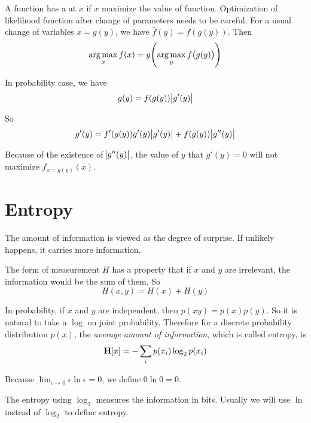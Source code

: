 \begin{theorem}
    A function has a  at $x$ if $x$ maximize the value of function. Optimization of likelihood function after change of parameters needs to be careful. For a usual change of variables $x = g(y)$, we have $\hat{f}(y) = f(g(y))$. Then
    \begin{equation}
         \argmax{x}f(x) = g\mleft(\argmax{y}f\mleft(g(y)\mright)\mright)
    \end{equation}
    
    In probability case, we have
    \begin{equation}
        g(y) = f(g(y)) \abs{g'(y)}
    \end{equation}
    
    So
    \begin{equation}
        g'(y) = f'(g(y)) g'(y) \abs{g'(y)} + f(g(y)) \abs{g''(y)}
    \end{equation}
    
    Because of the existence of $\abs{g''(y)}$, the value of $y$ that $g'(y) = 0$ will not maximize $f_{x = g(y)}(x)$.
\end{theorem}


\section{Entropy}

\begin{definition}
    The amount of information is viewed as the degree of surprise. If unlikely happens, it carries more information. 
    
    The form of measurement $H$ has a property that if $x$ and $y$ are irrelevant, the information would be the sum of them. So
    \begin{equation}
        H(x,y) = H(x) + H(y)
    \end{equation}
    
    In probability, if $x$ and $y$ are independent, then $p(xy)= p(x) p(y)$. So it is natural to take a $\log$ on joint probability. Therefore for a discrete probability distribution $p(x)$, the \emph{average amount of information}, which is called entropy, is
    \begin{equation}
        \entropy{x} = - \sum_i p(x_i) \log_2 p(x_i)
    \end{equation}
    
    Because $\displaystyle \lim_{\epsilon \rightarrow 0} \epsilon \ln \epsilon = 0$, we define $0 \ln 0 = 0$.
    
    The entropy using $\log_2$ measures the information in bits. Usually we will use $\ln$ instead of $\log_2$ to define entropy.
\end{definition}

